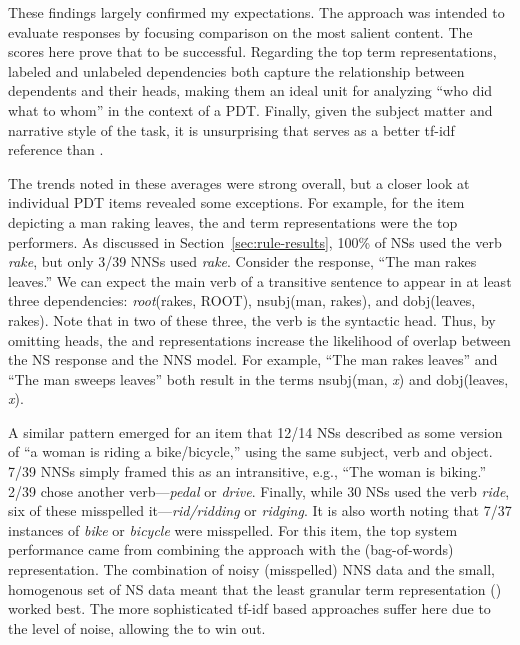 These findings largely confirmed my expectations. The  approach was intended to evaluate responses by focusing comparison on the most salient content. The scores here prove that to be successful. Regarding the top term representations, labeled and unlabeled dependencies both capture the relationship between dependents and their heads, making them an ideal unit for analyzing ``who did what to whom'' in the context of a PDT. Finally, given the subject matter and narrative style of the task, it is unsurprising that  serves as a better tf-idf reference than .

The trends noted in these averages were strong overall, but a closer look at individual PDT items revealed some exceptions. For example, for the item depicting a man raking leaves, the  and  term representations were the top performers. As discussed in Section~\ref{sec:rule-results}, 100\% of NSs used the verb \textit{rake}, but only 3/39 NNSs used \textit{rake}. Consider the response, ``The man rakes leaves.'' We can expect the main verb of a transitive sentence to appear in at least three dependencies: \textit{root}(rakes, ROOT), nsubj(man, rakes), and dobj(leaves, rakes). Note that in two of these three, the verb is the syntactic head. Thus, by omitting heads, the  and  representations increase the likelihood of overlap between the NS response and the NNS model. For example, ``The man rakes leaves'' and ``The man sweeps leaves'' both result in the  terms nsubj(man, \textit{x}) and dobj(leaves, \textit{x}).

A similar pattern emerged for an item that 12/14 NSs described as some version of ``a woman is riding a bike/bicycle,'' using the same subject, verb and object. 7/39 NNSs simply framed this as an intransitive, e.g., ``The woman is biking.'' 2/39 chose another verb---\textit{pedal} or \textit{drive}. Finally, while 30 NSs used the verb \textit{ride}, six of these misspelled it---\textit{rid/ridding} or \textit{ridging}. It is also worth noting that 7/37 instances of \textit{bike} or \textit{bicycle} were misspelled. For this item, the top system performance came from combining the  approach with the  (bag-of-words) representation. The combination of noisy (misspelled) NNS data and the small, homogenous set of NS data meant that the least granular term representation () worked best. The more sophisticated tf-idf based approaches suffer here due to the level of noise, allowing the  to win out.


